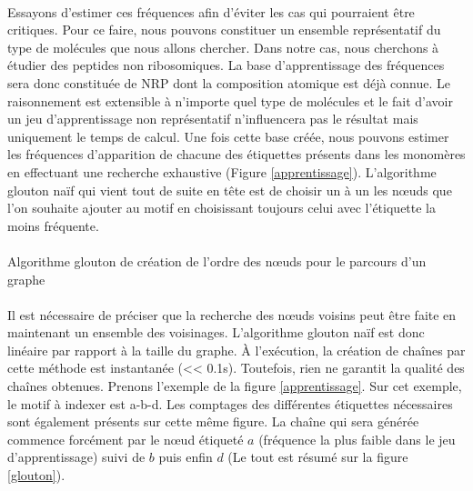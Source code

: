 \documentclass[12pt,french,twoside]{report}
\begin{document}
\paragraph{}Essayons d'estimer ces fréquences afin d'éviter les cas qui pourraient être critiques. Pour ce faire, nous pouvons
constituer un ensemble représentatif du type de molécules que nous allons chercher.
Dans notre cas, nous cherchons à étudier des peptides non ribosomiques. La base d'apprentissage
des fréquences sera donc constituée de NRP dont la composition atomique est déjà connue. Le raisonnement est extensible à
n'importe quel type de molécules et le fait d'avoir un jeu d'apprentissage non représentatif n'influencera pas le résultat mais
uniquement le temps de calcul. Une fois cette base créée, nous pouvons estimer les fréquences d'apparition de chacune des étiquettes
présents dans les monomères en effectuant une recherche exhaustive (Figure \ref{apprentissage}). L'algorithme glouton naïf qui
vient tout de suite en tête est de choisir un à un les n\oe{}uds que l'on souhaite ajouter au motif en choisissant toujours celui
avec l'étiquette la moins fréquente.

\paragraph{}
  \begin{algorithm}[H]
    \caption{Algorithme glouton de création de l'ordre des n\oe{}uds pour le parcours d'un graphe}
 
  \end{algorithm}


\paragraph{}Il est nécessaire de préciser que la recherche des n\oe{}uds voisins peut être faite en maintenant
un ensemble des voisinages. L'algorithme glouton naïf est donc linéaire par rapport à la taille du graphe. À l'exécution, la
création de chaînes par cette méthode est instantanée (<< 0.1s). Toutefois, rien ne garantit la qualité des chaînes obtenues.
Prenons l'exemple de la figure \ref{apprentissage}. Sur cet exemple, le motif à indexer est a-b-d. Les comptages des différentes
étiquettes nécessaires sont également présents sur cette même figure. La chaîne qui sera générée commence forcément par le n\oe{}ud
étiqueté $a$ (fréquence la plus faible dans le jeu d'apprentissage) suivi de $b$ puis enfin $d$ (Le tout est résumé sur la figure
\ref{glouton}).
\end{document}
